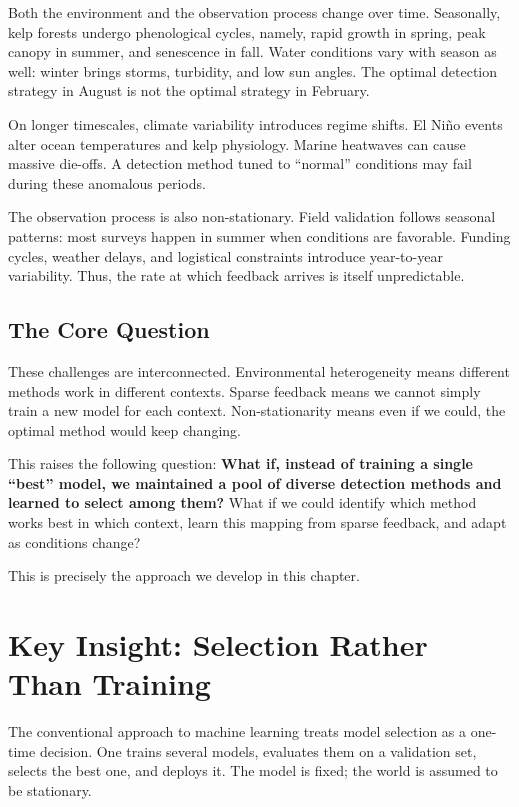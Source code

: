 \documentclass[11pt,a4paper]{article}
\begin{document}
Both the environment and the observation process change over time. Seasonally, kelp forests undergo phenological cycles, namely, rapid growth in spring, peak canopy in summer, and senescence in fall. Water conditions vary with season as well: winter brings storms, turbidity, and low sun angles. The optimal detection strategy in August is not the optimal strategy in February.

On longer timescales, climate variability introduces regime shifts. El Ni\~{n}o events alter ocean temperatures and kelp physiology. Marine heatwaves can cause massive die-offs. A detection method tuned to ``normal'' conditions may fail during these anomalous periods.

The observation process is also non-stationary. Field validation follows seasonal patterns: most surveys happen in summer when conditions are favorable. Funding cycles, weather delays, and logistical constraints introduce year-to-year variability. Thus, the rate at which feedback arrives is itself unpredictable.

\subsection{The Core Question}

These challenges are interconnected. Environmental heterogeneity means different methods work in different contexts. Sparse feedback means we cannot simply train a new model for each context. Non-stationarity means even if we could, the optimal method would keep changing.

This raises the following question: \textbf{What if, instead of training a single ``best'' model, we maintained a pool of diverse detection methods and learned to select among them?} What if we could identify which method works best in which context, learn this mapping from sparse feedback, and adapt as conditions change?

This is precisely the approach we develop in this chapter.


\section{Key Insight: Selection Rather Than Training}
\label{sec:insight}

The conventional approach to machine learning treats model selection as a one-time decision. One trains several models, evaluates them on a validation set, selects the best one, and deploys it. The model is fixed; the world is assumed to be stationary.
\end{document}
